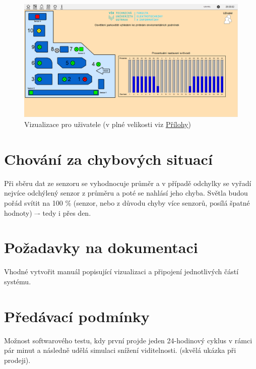 \begin{figure}[H]
    \centering\includegraphics[width=\textwidth]{Figures/PROMOTIC_uzivatel_vizualizace.png} 
    \caption{Vizualizace pro uživatele (v plné velikosti viz \hyperref[Sec-Prilohy]{Přílohy})}
    \label{Obr-Viz_uziv}
\end{figure}


\section{Chování za chybových situací}

Při sběru dat ze senzoru se vyhodnocuje průměr a v případě odchylky se vyřadí nejvíce odchýlený senzor z průměru a poté se nahlásí jeho chyba. Světla budou pořád svítit na 100 \% (senzor, nebo z důvodu chyby více senzorů, posílá špatné hodnoty) –- tedy i přes den.

\section{Požadavky na dokumentaci}

Vhodné vytvořit manuál popisující vizualizaci a připojení jednotlivých částí systému.

\section{Předávací podmínky}

Možnost softwarového testu, kdy první projde jeden 24-hodinový cyklus v rámci pár minut a následně udělá simulaci snížení viditelnosti. (skvělá ukázka při prodeji).



\endinput
